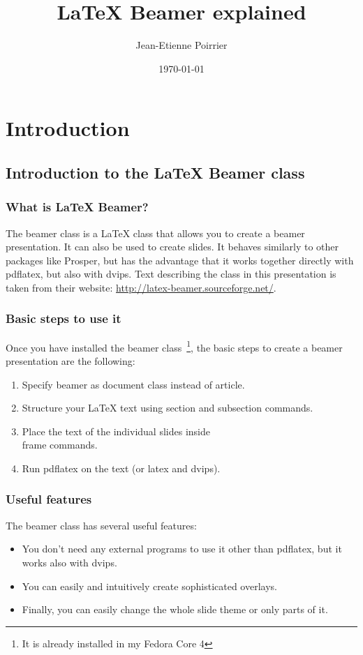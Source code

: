 \documentclass{beamer}
\title{LaTeX Beamer explained}
\author{Jean-Etienne Poirrier}
\date{\today}
\begin{document}
\frame{\titlepage}

\section[Outline]{}
\frame{\tableofcontents}

\section{Introduction}
\subsection{Introduction to the LaTeX Beamer class}

\frame
{
	\frametitle{What is LaTeX Beamer?}
	
	The beamer class is a LaTeX class that allows you to create a beamer presentation. It can also be used to create slides. It behaves similarly to other packages like Prosper, but has the advantage that it works together directly with pdflatex, but also with dvips.
	Text describing the class in this presentation is taken from their website: \href{http://latex-beamer.sourceforge.net/}{http://latex-beamer.sourceforge.net/}.
}

\frame
{
	\frametitle{Basic steps to use it}

	Once you have installed the beamer class~\footnote{It is already installed in my Fedora Core 4}, the basic steps to create a beamer presentation are the following:
	
	\begin{enumerate}
	\item Specify beamer as document class instead of article.
	\item Structure your LaTeX text using section and subsection commands.
	\item Place the text of the individual slides inside \\frame commands.
	\item Run pdflatex on the text (or latex and dvips).
	\end{enumerate}
}

\frame
{
	\frametitle{Useful features}

	The beamer class has several useful features:
	
	\begin{itemize}
	\item You don't need any external programs to use it other than pdflatex, but it works also with dvips.
	\item You can easily and intuitively create sophisticated overlays.
	\item Finally, you can easily change the whole slide theme or only parts of it.
	\end{itemize}
}
\end{document}
